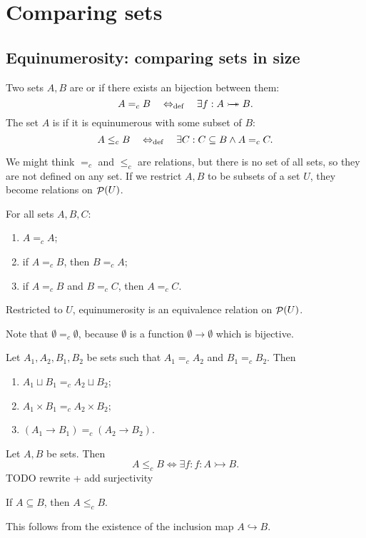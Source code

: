 \chapter{Comparing sets}
\section{Equinumerosity: comparing sets in size}
\begin{definition}
Two sets $A,B$ are  or  if there exists an bijection between them:
\[ A =_c B \quad\Leftrightarrow_{\text{def}}\quad \exists f: A\mathrel{\rightarrowtail\kern-1.9ex\twoheadrightarrow} B. \]
The set $A$ is  if it is equinumerous with some subset of $B$:
\[ A \leq_c B \quad\Leftrightarrow_{\text{def}}\quad \exists C: C\subseteq B \land A=_c C. \]
\end{definition}
We might think $=_c$ and $\leq_c$ are relations, but there is no set of all sets, so they are not defined on any set. If we restrict $A,B$ to be subsets of a set $U$, they become relations on $\mathop{\mathcal{P}}(U)$.
\begin{proposition}
For all sets $A,B,C$:
\begin{enumerate}
\item $A =_c A$;
\item if $A=_c B$, then $B =_c A$;
\item if $A=_c B$ and $B =_c C$, then $A =_c C$.
\end{enumerate}
Restricted to $U$, equinumerosity is an equivalence relation on $\mathop{\mathcal{P}}(U)$.
\end{proposition}

Note that $\emptyset =_c \emptyset$, because $\emptyset$ is a function $\emptyset\to \emptyset$ which is bijective.

\begin{lemma} \label{lemma:welldefinedCardinalArithemtic}
Let $A_1,A_2,B_1,B_2$ be sets such that $A_1=_c A_2$ and $B_1=_cB_2$. Then
\begin{enumerate}
\item $A_1 \sqcup B_1 =_c A_2\sqcup B_2$;
\item $A_1 \times B_1 =_c A_2\times B_2$;
\item $(A_1\to B_1) =_c (A_2\to B_2)$.
\end{enumerate}
\end{lemma}

\begin{proposition} \label{lemma:injectivityCardinality}
Let $A,B$ be sets. Then
\[ A\leq_c B \iff \exists f: f:A\rightarrowtail B. \]
TODO rewrite + add surjectivity
\end{proposition}
\begin{corollary}
If $A\subseteq B$, then $A\leq_c B$.
\end{corollary}
This follows from the existence of the inclusion map $A \hookrightarrow B$.

